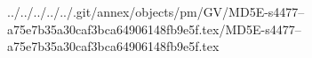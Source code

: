 ../../../../../.git/annex/objects/pm/GV/MD5E-s4477--a75e7b35a30caf3bca64906148fb9e5f.tex/MD5E-s4477--a75e7b35a30caf3bca64906148fb9e5f.tex